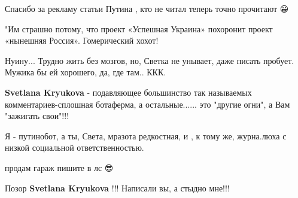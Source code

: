 \begin{itemize}
Спасибо за рекламу статьи Путина , кто не читал теперь точно прочитают 😀

 
"Им страшно потому, что проект «Успешная Украина» похоронит проект «нынешняя Россия». Гомерический хохот!

 
Нуину... Трудно жить без мозгов, но, Светка не унывает, даже писать пробует. Мужика бы ей хорошего, да, где там.. ККК.

 
\textbf{Svetlana Kryukova} - подавляющее большинство так называемых
комментариев-сплошная ботаферма, а остальные...... это "другие огни", а Вам
"зажигать свои"!!!

 
Я - путинобот, а ты, Света, мразота редкостная, и , к тому же, журна.люха с низкой социальной ответственностью.

 

продам гараж
пишите в лс 😎

 
Позор \textbf{Svetlana Kryukova} !!!
Написали вы, а стыдно мне!!!


\end{itemize}
